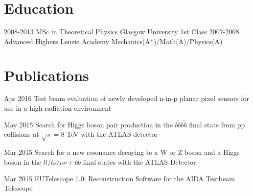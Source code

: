 \documentclass[]{twentysecondcv}
\begin{document}
\section*{Education}

\begin{twenty}
  \twentyitem
    {2008-2013}
    {MSc in Theoretical Physics }
    {Glasgow University}
    {1st Class}
  \twentyitem
    {2007-2008}
    {Advanced Highers}
    {Lenzie Academy}
    {Mechanics(A*)/Math(A)/Physics(A)}
\end{twenty}



\section*{Publications}

\begin{twentyshort}
  \twentyitemshort
    {Apr 2016}
    {Test beam evaluation of newly developed n-in-p planar pixel sensors for use in a high radiation environment}
\end{twentyshort}

\begin{twentyshort}
  \twentyitemshort
    {May 2015}
    {Search for Higgs boson pair production in the $b\tilde{b}b\tilde{b}$ final state from pp collisions at $\sqrt{s}=8$ TeV with the ATLAS detector}
\end{twentyshort}

\begin{twentyshort}
  \twentyitemshort
    {Mar 2015}
    {Search for a new resonance decaying to a W or Z boson and a Higgs boson in the $ll/l\nu/\nu\nu+b\tilde{b}$ final states with the ATLAS Detector}
\end{twentyshort}

\begin{twentyshort}
  \twentyitemshort
    {Mar 2015}
    {EUTelescope 1.0: Reconstruction Software for the AIDA Testbeam Telescope}
\end{twentyshort}
\end{document}
